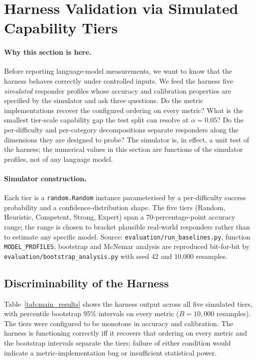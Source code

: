 \documentclass{article}
\begin{document}
\section{Harness Validation via Simulated Capability Tiers}
\label{sec:results}

\paragraph{Why this section is here.} Before reporting language-model measurements, we want to know that the harness behaves correctly under controlled inputs. We feed the harness five \emph{simulated} responder profiles whose accuracy and calibration properties are specified by the simulator and ask three questions. Do the metric implementations recover the configured ordering on every metric? What is the smallest tier-scale capability gap the test split can resolve at $\alpha = 0.05$? Do the per-difficulty and per-category decompositions separate responders along the dimensions they are designed to probe? The simulator is, in effect, a unit test of the harness; the numerical values in this section are functions of the simulator profiles, not of any language model.

\paragraph{Simulator construction.} Each tier is a \texttt{random.Random} instance parameterised by a per-difficulty success probability and a confidence-distribution shape. The five tiers (Random, Heuristic, Competent, Strong, Expert) span a 70-percentage-point accuracy range; the range is chosen to bracket plausible real-world responders rather than to estimate any specific model. Source: \texttt{evaluation/run\_baselines.py}, function \texttt{MODEL\_PROFILES}; bootstrap and McNemar analysis are reproduced bit-for-bit by \texttt{evaluation/bootstrap\_analysis.py} with seed 42 and 10{,}000 resamples.

\subsection{Discriminability of the Harness}

Table~\ref{tab:main_results} shows the harness output across all five simulated tiers, with percentile bootstrap 95\% intervals on every metric ($B = 10{,}000$ resamples). The tiers were configured to be monotone in accuracy and calibration. The harness is functioning correctly iff it recovers that ordering on every metric and the bootstrap intervals separate the tiers; failure of either condition would indicate a metric-implementation bug or insufficient statistical power.
\end{document}
